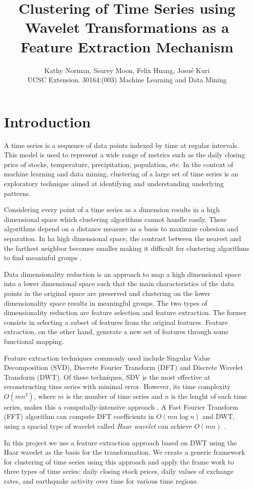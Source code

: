\documentclass{article}
\title{Clustering of Time Series using Wavelet Transformations as a Feature Extraction Mechanism}
\author{\textsf{Kathy Norman, Ssurey Moon, Felix Huang, Josu\'e Kuri}\\UCSC Extension. 30164:(003) Machine Learning and Data Mining}
\begin{document}
\maketitle

\section{Introduction}
A time series is a sequence of data points indexed by time at regular intervals. This model is used to represent a wide range of metrics such as the daily closing price of stocks, temperature, precipitation, population, etc. In the context of machine learning and data mining, clustering of a large set of time series is an exploratory technique aimed at identifying and understanding underlying patterns.

Considering every point of a time series as a dimension results in a high dimensional space which clustering algorithms cannot handle easily. These algorithms depend on a distance measure as a basis to maximize cohesion and separation. In ha high dimensional space, the contrast between the nearest and the farthest neighbor becomes smaller making it difficult for clustering algorithms to find meaninful groups \cite{BGRS99}.

Data dimensionality reduction is an approach to map a high dimensional space into a lower dimensional space such that the main characteristics of the data points in the original space are preserved and clustering on the lower dimensionality space results in meaningful groups. The two types of dimensionality reduction are feature selection and feature extraction. The former consists in selecting a subset of features from the original features. Feature extraction, on the other hand, generate a new set of features through some functional mapping.

Feature extraction techniques commonly used include Singular Value Decomposition (SVD), Discrete Fourier Transform (DFT) and Discrete Wavelet Transform (DWT). Of these techniques, SDV is the most effective at reconstructing time series with minimal error. However, its time complexity $O(mn^2)$, where $m$ is the number of time series and $n$ is the lenght of each time series, makes this a computally-intensive approach \cite{ZHZL06}. A Fast Fourier Transform (FFT) algorithm can compute DFT coefficients in $O(mn \log n)$ and DWT, using a spacial type of wavelet called {\em Haar wavelet} can achieve $O(mn)$ \cite{ZHZL06}.

In this project we use a feature extraction approach based on DWT using the Haar wavelet as the basis for the transformation. We create a generic framework for clustering of time series using this approach and apply the frame work to three types of time series: daily closing stock prices, daily values of exchange rates, and earthquake activity over time for various time regions.
\end{document}

